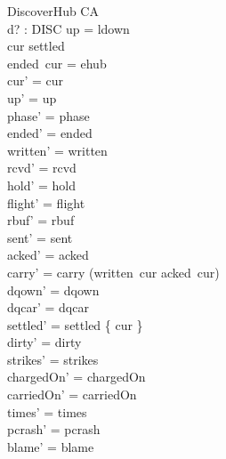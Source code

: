 \documentclass[a4paper,10pt,fleqn]{article}
\begin{document}
\begin{schema}{DiscoverHub}
  \Delta CA \\
  d? : DISC
\where
  up = ldown \\
  cur \notin settled \\
  ended~cur = ehub \\
  cur' = cur \\
  up' = up \\
  phase' = phase \\
  ended' = ended \\
  written' = written \\
  rcvd' = rcvd \\
  hold' = hold \\
  flight' = flight \\
  rbuf' = rbuf \\
  sent' = sent \\
  acked' = acked \\
  carry' = carry \cup (written~cur \setminus acked~cur) \\
  dqown' = dqown \\
  dqcar' = dqcar \\
  settled' = settled \cup \{ cur \} \\
  dirty' = dirty \\
  strikes' = strikes \\
  chargedOn' = chargedOn \\
  carriedOn' = carriedOn \\
  times' = times \\
  pcrash' = pcrash \\
  blame' = blame
\end{schema}
\end{document}
